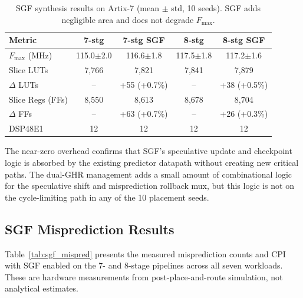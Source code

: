 \documentclass[journal]{IEEEtran}
\begin{document}
\begin{table}[t]
\begin{table}[t]
\begin{table}[t]
\begin{table}[t]
\begin{table}[t]
\begin{table}[t]
\begin{table}[t]
\centering
\caption{SGF synthesis results on Artix-7 (mean $\pm$ std, 10 seeds). SGF adds negligible area and does not degrade $F_{\max}$.}
\label{tab:sgf_synth}
\small
\begin{tabular}{@{}lcccc@{}}
\toprule
\textbf{Metric} & \textbf{7-stg} & \textbf{7-stg SGF} & \textbf{8-stg} & \textbf{8-stg SGF} \\
\midrule
$F_{\max}$ (MHz)  & 115.0$\pm$2.0  & 116.6$\pm$1.8  & 117.5$\pm$1.8  & 117.2$\pm$1.6 \\
Slice LUTs        & 7{,}766        & 7{,}821         & 7{,}841        & 7{,}879 \\
$\Delta$ LUTs     & --             & +55 (+0.7\%)    & --             & +38 (+0.5\%) \\
Slice Regs (FFs)  & 8{,}550        & 8{,}613         & 8{,}678        & 8{,}704 \\
$\Delta$ FFs      & --             & +63 (+0.7\%)    & --             & +26 (+0.3\%) \\
DSP48E1           & 12             & 12              & 12             & 12 \\
\bottomrule
\end{tabular}
\end{table}

The near-zero overhead confirms that SGF's speculative update and checkpoint logic is absorbed by the existing predictor datapath without creating new critical paths. The dual-GHR management adds a small amount of combinational logic for the speculative shift and misprediction rollback mux, but this logic is not on the cycle-limiting path in any of the 10 placement seeds.

\subsection{SGF Misprediction Results}

Table~\ref{tab:sgf_mispred} presents the measured misprediction counts and CPI with SGF enabled on the 7- and 8-stage pipelines across all seven workloads. These are hardware measurements from post-place-and-route simulation, not analytical estimates.


\end{table}
\end{table}
\end{table}
\end{table}
\end{table}
\end{table}
\end{document}
